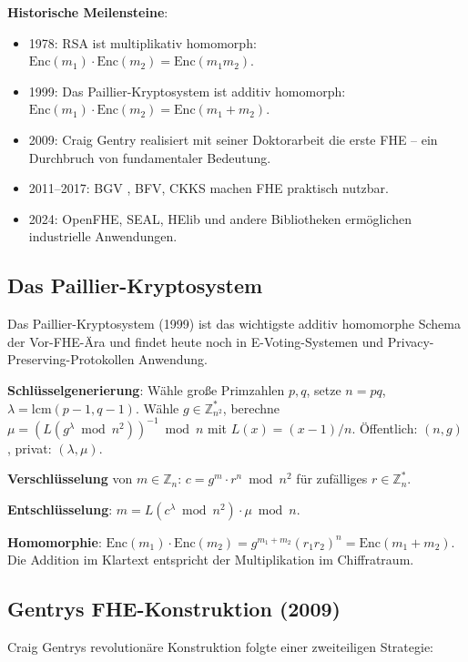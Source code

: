﻿\documentclass[a4paper,12pt]{scrreprt}
\theoremstyle{definition}
\begin{document}
\textbf{Historische Meilensteine}:
\begin{itemize}
    \item 1978: RSA ist multiplikativ homomorph: $\mathrm{Enc}(m_1)\cdot\mathrm{Enc}(m_2) = \mathrm{Enc}(m_1 m_2)$.
    \item 1999: Das Paillier-Kryptosystem ist additiv homomorph: $\mathrm{Enc}(m_1)\cdot\mathrm{Enc}(m_2) = \mathrm{Enc}(m_1+m_2)$.
    \item 2009: Craig Gentry realisiert mit seiner Doktorarbeit \cite{Gen09} die erste FHE -- ein Durchbruch von fundamentaler Bedeutung.
    \item 2011--2017: BGV \cite{BGV12}, BFV, CKKS \cite{CKKS17} machen FHE praktisch nutzbar.
    \item 2024: OpenFHE, SEAL, HElib und andere Bibliotheken ermöglichen industrielle Anwendungen.
\end{itemize}

\subsection{Das Paillier-Kryptosystem}

Das Paillier-Kryptosystem (1999) ist das wichtigste additiv homomorphe Schema der Vor-FHE-Ära und findet heute noch in E-Voting-Systemen und Privacy-Preserving-Protokollen Anwendung.

\textbf{Schlüsselgenerierung}: Wähle große Primzahlen $p, q$, setze $n = pq$, $\lambda = \mathrm{lcm}(p-1,q-1)$. Wähle $g \in \mathbb{Z}_{n^2}^*$, berechne $\mu = (L(g^\lambda \bmod n^2))^{-1} \bmod n$ mit $L(x) = (x-1)/n$. Öffentlich: $(n,g)$, privat: $(\lambda,\mu)$.

\textbf{Verschlüsselung} von $m \in \mathbb{Z}_n$: $c = g^m \cdot r^n \bmod n^2$ für zufälliges $r \in \mathbb{Z}_n^*$.

\textbf{Entschlüsselung}: $m = L(c^\lambda \bmod n^2) \cdot \mu \bmod n$.

\textbf{Homomorphie}: $\mathrm{Enc}(m_1) \cdot \mathrm{Enc}(m_2) = g^{m_1+m_2}(r_1r_2)^n = \mathrm{Enc}(m_1+m_2)$. Die Addition im Klartext entspricht der Multiplikation im Chiffratraum.

\subsection{Gentrys FHE-Konstruktion (2009)}

Craig Gentrys revolutionäre Konstruktion \cite{Gen09} folgte einer zweiteiligen Strategie:
\end{document}

